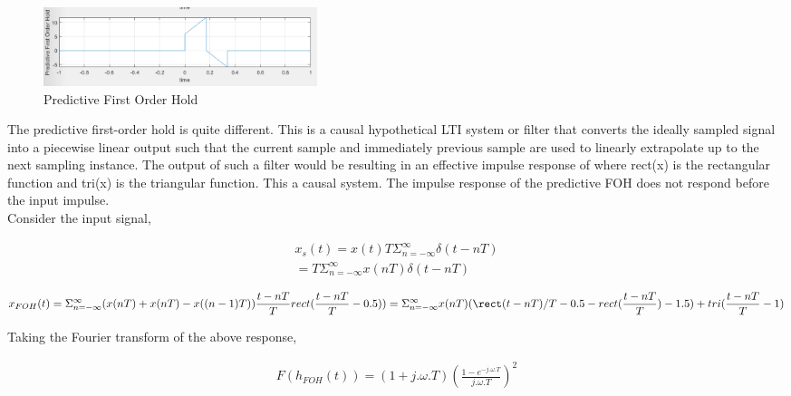 \documentclass{article}
\begin{document}
\begin{figure}[htbp]
    \begin{center}
	\includegraphics[width=80mm]{figures/PFOH.PNG}
    \end{center}
    \caption{Predictive First Order Hold}
\end{figure}

The predictive first-order hold is quite different. This is a causal hypothetical LTI system or filter that converts the ideally sampled signal into a piecewise linear output such that the current sample and immediately previous sample are used to linearly extrapolate up to the next sampling instance. The output of such a filter would be resulting in an effective impulse response of where rect(x) is the rectangular function and tri(x) is the triangular function. This a causal system. The impulse response of the predictive FOH does not respond before the input impulse. 
\\
Consider the input signal, 

\begin{equation}
\begin{aligned}
    x_s(t) = x(t) T \Sigma_{n = -\infty}^{\infty} \delta(t-nT) \\
    
    = T \Sigma_{n = -\infty}^{\infty} x(nT) \delta(t-nT)
\end{aligned}
\end{equation}


\begin{equation}
\begin{aligned}
    x_{FOH}(t) = \Sigma_{n = -\infty}^{\infty} (x(nT) + x(nT) - x((n-1)T)) \frac{t-nT}{T} rect(\frac{t-nT}{T} - 0.5)  )
    
    = \Sigma_{n = -\infty}^{\infty} x(nT) (\rect(t-nT)/T - 0.5 - rect(\frac{t-nT}{T}) - 1.5) + tri(\frac{t-nT}{T}-1)
\end{aligned}
\end{equation}
    
Taking the Fourier transform of the above response, 

\begin{equation}
\begin{aligned}
    F(h_{FOH}(t)) = (1 + j.\omega.T) {(\frac{1-e^{-j.\omega.T}}{j.\omega.T})}^2
\end{aligned}
\end{equation}
    
\end{document}

